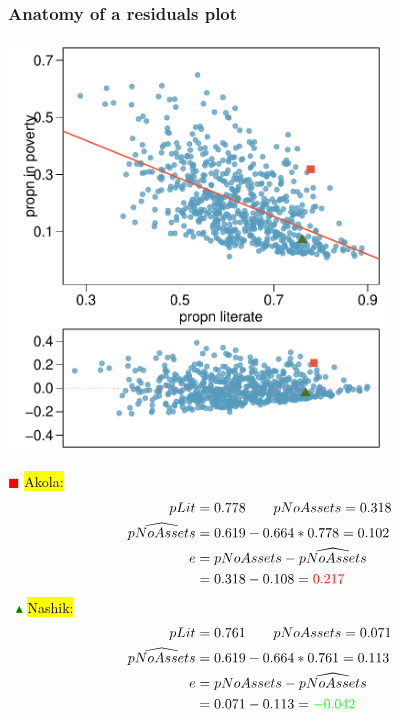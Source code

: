 \documentclass[notes,11pt, aspectratio=169]{beamer}
\begin{document}
\begin{frame}
\frametitle{Anatomy of a residuals plot}

{
\begin{center}
\includegraphics[width=0.75\textwidth]{graphs/l08f09}
\end{center}
}
{
\textcolor{red}{{\LARGE $\blacksquare$}} \hl{Akola:}
\begin{align*}
pLit &= 0.778 \qquad pNoAssets = 0.318 \\
\widehat{pNoAssets} &= 0.619 - 0.664 * 0.778 = 0.102 \\
e &= pNoAssets - \widehat{pNoAssets} \\
&= 0.318 - 0.108 = \textcolor{red}{0.217}
\end{align*}
$\:$
\pause
\textcolor{green}{{\Large $\blacktriangle$}} \hl{Nashik:}
\begin{align*}
pLit &= 0.761 \qquad pNoAssets = 0.071 \\
\widehat{pNoAssets} &= 0.619 - 0.664 * 0.761 = 0.113 \\
e &= pNoAssets - \widehat{pNoAssets} \\
&= 0.071 - 0.113 = \textcolor{green}{-0.042}
\end{align*}
}

\end{frame}


\end{document}
